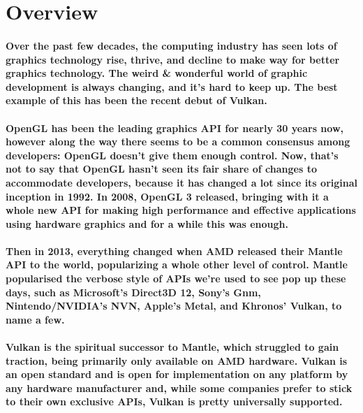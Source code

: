\section{Overview}\label{overview}

\paragraph{
Over the past few decades, the computing industry has seen lots of
graphics technology rise, thrive, and decline to make way for better graphics technology. The weird \& wonderful world of graphic development is always changing, and it's hard to keep up. The best example of this has been the recent debut of Vulkan.
}

\paragraph{
OpenGL has been the leading graphics API for nearly 30 years now,
however along the way there seems to be a common consensus among
developers: OpenGL doesn't give them enough control. Now, that's not to say that OpenGL hasn't seen its fair share of changes to accommodate developers, because it has changed a lot since its original inception in 1992.
In 2008, OpenGL 3 released, bringing with it a whole new API for making high performance and effective applications using hardware graphics and for a while this was enough.
}

\paragraph{
Then in 2013, everything changed when AMD released their Mantle API to the world, popularizing a whole other level of control. Mantle popularised the verbose style of APIs we're used to see pop up these days, such as Microsoft's Direct3D 12, Sony's Gnm, Nintendo/NVIDIA's NVN, Apple's Metal, and Khronos' Vulkan, to name a few.
}

\paragraph{
Vulkan is the spiritual successor to Mantle, which struggled to gain traction, being primarily only available on AMD hardware. Vulkan is an open standard and is open for implementation on any platform by any hardware manufacturer and, while some companies prefer to stick to their own exclusive APIs, Vulkan is pretty universally supported.
}

